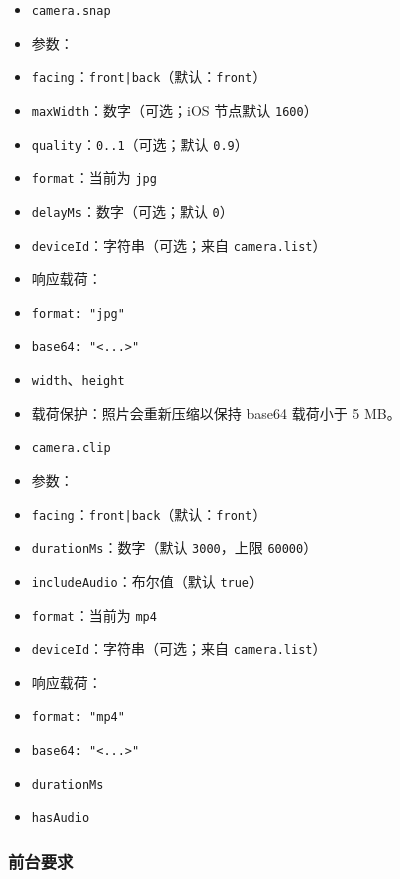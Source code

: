 \begin{itemize}
  \item \texttt{camera.snap}
  \item 参数：
  \item \texttt{facing}：\texttt{front|back}（默认：\texttt{front}）
  \item \texttt{maxWidth}：数字（可选；iOS 节点默认 \texttt{1600}）
  \item \texttt{quality}：\texttt{0..1}（可选；默认 \texttt{0.9}）
  \item \texttt{format}：当前为 \texttt{jpg}
  \item \texttt{delayMs}：数字（可选；默认 \texttt{0}）
  \item \texttt{deviceId}：字符串（可选；来自 \texttt{camera.list}）
  \item 响应载荷：
  \item \texttt{format: "jpg"}
  \item \texttt{base64: "<...>"}
  \item \texttt{width}、\texttt{height}
  \item 载荷保护：照片会重新压缩以保持 base64 载荷小于 5 MB。
\end{itemize}


\begin{itemize}
  \item \texttt{camera.clip}
  \item 参数：
  \item \texttt{facing}：\texttt{front|back}（默认：\texttt{front}）
  \item \texttt{durationMs}：数字（默认 \texttt{3000}，上限 \texttt{60000}）
  \item \texttt{includeAudio}：布尔值（默认 \texttt{true}）
  \item \texttt{format}：当前为 \texttt{mp4}
  \item \texttt{deviceId}：字符串（可选；来自 \texttt{camera.list}）
  \item 响应载荷：
  \item \texttt{format: "mp4"}
  \item \texttt{base64: "<...>"}
  \item \texttt{durationMs}
  \item \texttt{hasAudio}
\end{itemize}


\subsubsection{前台要求}


